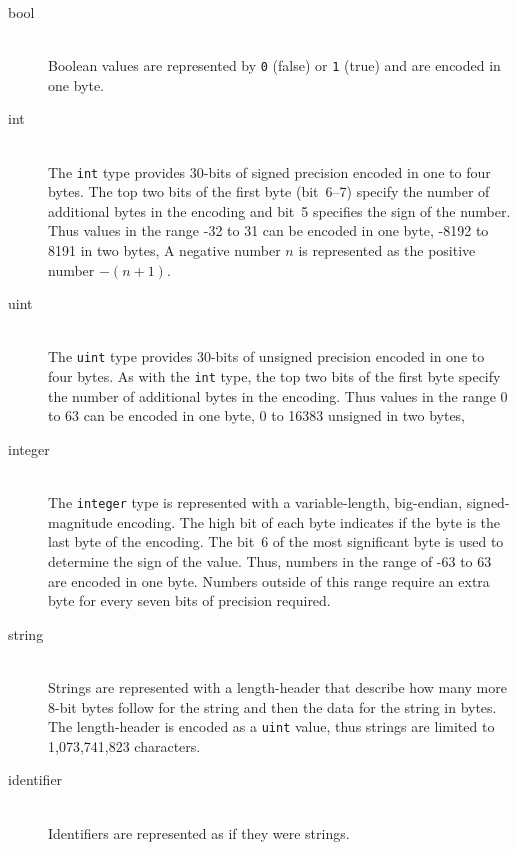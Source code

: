 \begin{description}
  \item[bool] \mbox{}\\
    Boolean values are represented by \lstinline!0! (false) or \lstinline!1! (true)
    and are encoded in one byte.

  \item[int] \mbox{}\\
    The \lstinline!int! type provides 30-bits of signed precision encoded in one to
    four bytes.
    The top two bits of the first byte (bit~6--7) specify the number of additional
    bytes in the encoding and bit~5 specifies the sign of the number.
    Thus values in the range -32 to 31 can be encoded in one byte,
    -8192 to 8191 in two bytes, \etc{}
    A negative number $n$ is represented as the positive number $-(n+1)$.

  \item[uint] \mbox{}\\
    The \lstinline!uint! type provides 30-bits of unsigned precision encoded in one
    to four bytes.
    As with the \lstinline!int! type, the top two bits of the first byte specify the
    number of additional bytes in the encoding.
    Thus values in the range 0 to 63 can be encoded in one byte,
    0 to 16383 unsigned in two bytes, \etc{}

  \item[integer] \mbox{}\\
    The \asdl{} \lstinline!integer! type is represented with a variable-length,
    big-endian, signed-magnitude encoding.
    The high bit of each byte indicates if the byte is the last byte of
    the encoding.
    The bit~6 of the most significant byte is used to determine the
    sign of the value.
    Thus, numbers in the range of -63 to 63 are encoded in one byte.
    Numbers outside of this range require an extra byte for every seven bits
    of precision required.

  \item[string] \mbox{}\\
    Strings are represented with a length-header that describe how many more
    8-bit bytes follow for the string and then the data for the string in bytes.
    The length-header is encoded as a \lstinline!uint! value, thus strings are limited
    to 1,073,741,823 characters.

  \item[identifier] \mbox{}\\
    Identifiers are represented as if they were strings.
\end{description}%

